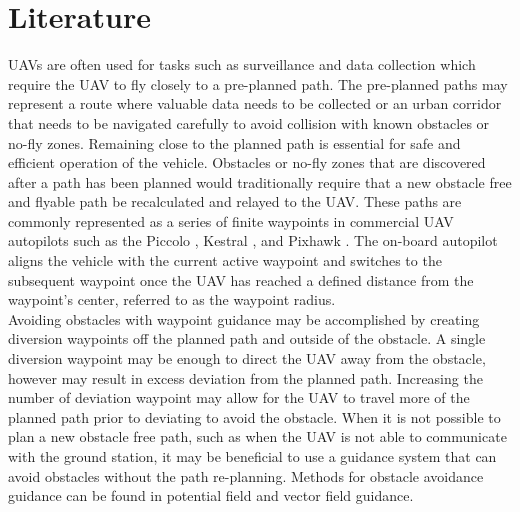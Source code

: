 \documentclass[conf]{new-aiaa}
\begin{document}
%

\section{Literature}

UAVs are often used for tasks such as surveillance and data collection which require the UAV to fly closely to a pre-planned path. The pre-planned paths may represent a route where valuable data needs to be collected or an urban corridor that needs to be navigated carefully to avoid collision with known obstacles or no-fly zones. Remaining close to the planned path is essential for safe and efficient operation of the vehicle. Obstacles or no-fly zones that are discovered after a path has been planned would traditionally require that a new obstacle free and flyable path be recalculated and relayed to the UAV. These paths are commonly represented as a series of finite waypoints in commercial UAV autopilots such as the Piccolo \cite{piccolo}, Kestral \cite{kestrel}, and Pixhawk \cite{pix}. The on-board autopilot aligns the vehicle with the current active waypoint and switches to the subsequent waypoint once the UAV has reached a defined distance from the waypoint’s center, referred to as the waypoint radius. \\

Avoiding obstacles with waypoint guidance may be accomplished by creating diversion waypoints off the planned path and outside of the obstacle. A single diversion waypoint may be enough to direct the UAV away from the obstacle, however may result in excess deviation from the planned path. Increasing the number of deviation waypoint may allow for the UAV to travel more of the planned path prior to deviating to avoid the obstacle. When it is not possible to plan a new obstacle free path, such as when the UAV is not able to communicate with the ground station, it may be beneficial to use a guidance system that can avoid obstacles without the path re-planning. Methods for obstacle avoidance guidance can be found in potential field and vector field guidance. \\ 
\end{document}
